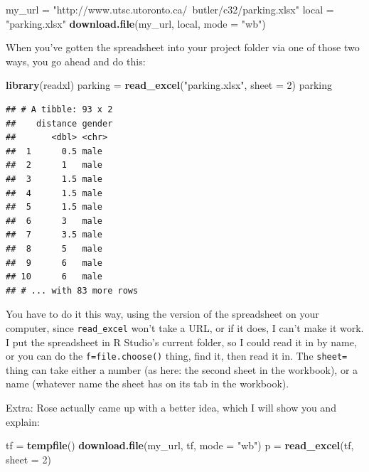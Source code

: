 \documentclass[]{tufte-book}
\newenvironment{Shaded}{}{}
\newcommand{\DataTypeTok}[1]{\textcolor[rgb]{0.56,0.13,0.00}{#1}}
\newcommand{\DecValTok}[1]{\textcolor[rgb]{0.25,0.63,0.44}{#1}}
\newcommand{\KeywordTok}[1]{\textcolor[rgb]{0.00,0.44,0.13}{\textbf{#1}}}
\newcommand{\NormalTok}[1]{#1}
\newcommand{\StringTok}[1]{\textcolor[rgb]{0.25,0.44,0.63}{#1}}
\theoremstyle{definition}
\theoremstyle{definition}
\theoremstyle{definition}
\theoremstyle{remark}
\begin{document}
\begin{Shaded}
\begin{Highlighting}[]
\NormalTok{my_url =}\StringTok{ "http://www.utsc.utoronto.ca/~butler/c32/parking.xlsx"}
\NormalTok{local =}\StringTok{ "parking.xlsx"}
\KeywordTok{download.file}\NormalTok{(my_url, local, }\DataTypeTok{mode =} \StringTok{"wb"}\NormalTok{)}
\end{Highlighting}
\end{Shaded}

When you've gotten the spreadsheet into your project folder via one of
those two ways, you go ahead and do this:

\begin{Shaded}
\begin{Highlighting}[]
\KeywordTok{library}\NormalTok{(readxl)}
\NormalTok{parking =}\StringTok{ }\KeywordTok{read_excel}\NormalTok{(}\StringTok{"parking.xlsx"}\NormalTok{, }\DataTypeTok{sheet =} \DecValTok{2}\NormalTok{)}
\NormalTok{parking}
\end{Highlighting}
\end{Shaded}

\begin{verbatim}
## # A tibble: 93 x 2
##    distance gender
##       <dbl> <chr> 
##  1      0.5 male  
##  2      1   male  
##  3      1.5 male  
##  4      1.5 male  
##  5      1.5 male  
##  6      3   male  
##  7      3.5 male  
##  8      5   male  
##  9      6   male  
## 10      6   male  
## # ... with 83 more rows
\end{verbatim}

You have to do it this way, using the version of the spreadsheet on your
computer, since \texttt{read\_excel} won't take a URL, or if it does, I
can't make it work.
 I put the
spreadsheet in R Studio's current folder, so I could read it in by name,
or you can do the \texttt{f=file.choose()} thing, find it, then read it
in. The \texttt{sheet=} thing can take either a number (as here: the
second sheet in the workbook), or a name (whatever name the sheet has on
its tab in the workbook).

Extra: Rose actually came up with a better idea, which I will show you
and explain:

\begin{Shaded}
\begin{Highlighting}[]
\NormalTok{tf =}\StringTok{ }\KeywordTok{tempfile}\NormalTok{()}
\KeywordTok{download.file}\NormalTok{(my_url, tf, }\DataTypeTok{mode =} \StringTok{"wb"}\NormalTok{)}
\NormalTok{p =}\StringTok{ }\KeywordTok{read_excel}\NormalTok{(tf, }\DataTypeTok{sheet =} \DecValTok{2}\NormalTok{)}
\end{Highlighting}
\end{Shaded}
\end{document}
